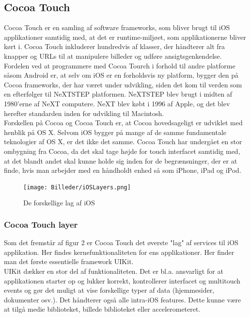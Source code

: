 \documentclass[a4paper,10pt,titlepage]{article}
\begin{document}
\subsection{Cocoa Touch}
Cocoa Touch er en samling af software frameworks, som bliver brugt til iOS applikationer samtidig med, at det er runtime-miljøet, som applikationerne bliver kørt i. Cocoa Touch inkluderer hundredvis af klasser, der håndterer alt fra knapper og URLs til at manipulere billeder og udføre ansigtsgenkendelse.\\
Fordelen ved at programmere med Cocoa Tourch i forhold til andre platforme såsom Android er, at selv om iOS er en forholdsvis ny platform, bygger den på Cocoa frameworks, der har været under udvikling, siden det kom til verden som en efterfølger til NeXTSTEP platformen. NeXTSTEP blev brugt i midten af 1980'erne af NeXT computere. NeXT blev købt i 1996 af Apple, og det blev herefter standarden inden for udvikling til Macintosh.\\
Forskellen på Cocoa og Cocoa Touch er, at Cocoa hovedsageligt er udviklet med henblik på OS X. Selvom iOS bygger på mange af de samme fundamentale teknologier af OS X, er det ikke det samme. Cocoa Touch har undergået en stor ombygning fra Cocoa, da det skal tage højde for touch interfacet samtidig med, at det blandt andet skal kunne holde sig inden for de begrænsninger, der er at finde, hvis man arbejder med en håndholdt enhed så som iPhone, iPad og iPod. \parencite[side 103]{Teach}

\begin{figure}[H]
\centering
\texttt{[image: Billeder/iOSLayers.png]}
\caption{De forskellige lag af iOS\parencite{Layers}}
\end{figure}

\subsubsection{Cocoa Touch layer}
Som det fremstår af figur 2 er Cocoa Touch det øverste "lag" af services til iOS applikation. Her findes kernefunktionaliteten for ens applikationer. Her finder man det første essentielle framework UIKit.\\
UIKit dækker en stor del af funktionaliteten. Det er bl.a. ansvarligt for at applikationen starter op og lukker korrekt, kontrollerer interfacet og multitouch events og gør det muligt at vise forskellige typer af data (hjemmesider, dokumenter osv.). Det håndterer også alle intra-iOS features. Dette kunne være at tilgå medie biblioteket, billede biblioteket eller accelerometeret.\parencite[side 103-104]{Teach}
\end{document}
